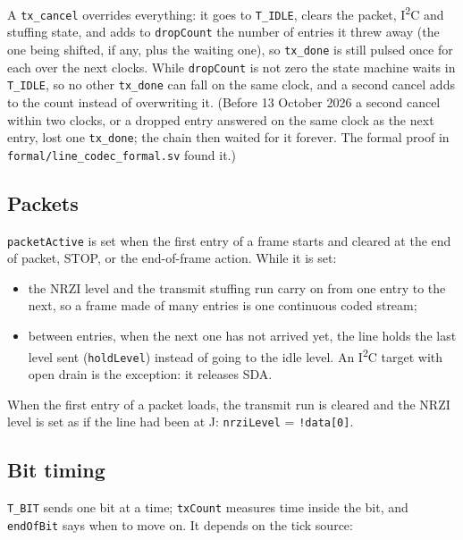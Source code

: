 \documentclass[11pt,a4paper]{article}
\newcommand{\sig}[1]{\texttt{#1}}
\begin{document}
A \sig{tx\_cancel} overrides everything: it goes to \sig{T\_IDLE}, clears the packet, I\textsuperscript{2}C and stuffing state, and adds to \sig{dropCount} the number of entries it threw away (the one being shifted, if any, plus the waiting one), so \sig{tx\_done} is still pulsed once for each over the next clocks. While \sig{dropCount} is not zero the state machine waits in \sig{T\_IDLE}, so no other \sig{tx\_done} can fall on the same clock, and a second cancel adds to the count instead of overwriting it. (Before 13 October 2026 a second cancel within two clocks, or a dropped entry answered on the same clock as the next entry, lost one \sig{tx\_done}; the chain then waited for it forever. The formal proof in \sig{formal/line\_codec\_formal.sv} found it.)

\subsection{Packets}

\sig{packetActive} is set when the first entry of a frame starts and cleared at the end of packet, STOP, or the end-of-frame action. While it is set:
\begin{itemize}
\item the NRZI level and the transmit stuffing run carry on from one entry to the next, so a frame made of many entries is one continuous coded stream;
\item between entries, when the next one has not arrived yet, the line holds the last level sent (\sig{holdLevel}) instead of going to the idle level. An I\textsuperscript{2}C target with open drain is the exception: it releases SDA.
\end{itemize}
When the first entry of a packet loads, the transmit run is cleared and the NRZI level is set as if the line had been at J: \sig{nrziLevel} = \sig{!data[0]}.

\subsection{Bit timing}\label{sec:gen}

\sig{T\_BIT} sends one bit at a time; \sig{txCount} measures time inside the bit, and \sig{endOfBit} says when to move on. It depends on the tick source:
\end{document}
